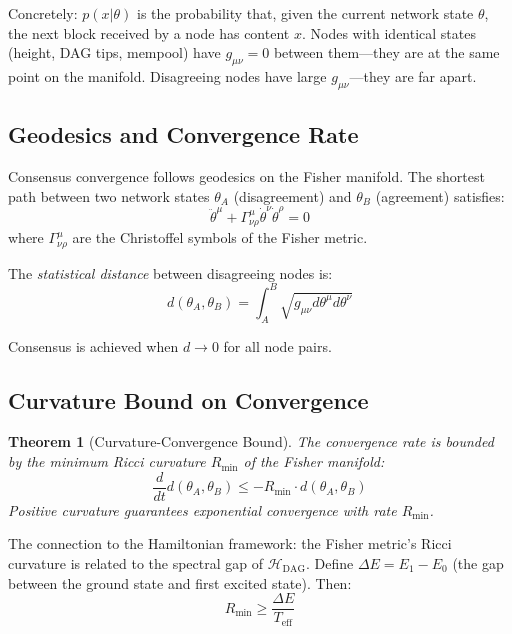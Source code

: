 \documentclass[12pt,a4paper,twocolumn]{article}
\newtheorem{theorem}{Theorem}
\newcommand{\Hdag}{\mathcal{H}_{\mathrm{DAG}}}
\newcommand{\Teff}{T_{\mathrm{eff}}}
\begin{document}
Concretely: $p(x|\theta)$ is the probability that, given the current network state $\theta$, the next block received by a node has content $x$. Nodes with identical states (height, DAG tips, mempool) have $g_{\mu\nu} = 0$ between them---they are at the same point on the manifold. Disagreeing nodes have large $g_{\mu\nu}$---they are far apart.

\subsection{Geodesics and Convergence Rate}

Consensus convergence follows geodesics on the Fisher manifold. The shortest path between two network states $\theta_A$ (disagreement) and $\theta_B$ (agreement) satisfies:
\begin{equation}
\ddot{\theta}^\mu + \Gamma^\mu_{\nu\rho} \dot{\theta}^\nu \dot{\theta}^\rho = 0
\end{equation}
where $\Gamma^\mu_{\nu\rho}$ are the Christoffel symbols of the Fisher metric.

The \emph{statistical distance} between disagreeing nodes is:
\begin{equation}
d(\theta_A, \theta_B) = \int_A^B \sqrt{g_{\mu\nu} d\theta^\mu d\theta^\nu}
\end{equation}

Consensus is achieved when $d \to 0$ for all node pairs.

\subsection{Curvature Bound on Convergence}

\begin{theorem}[Curvature-Convergence Bound]
The convergence rate is bounded by the minimum Ricci curvature $R_{\min}$ of the Fisher manifold:
\begin{equation}
\frac{d}{dt} d(\theta_A, \theta_B) \leq -R_{\min} \cdot d(\theta_A, \theta_B)
\end{equation}
Positive curvature guarantees exponential convergence with rate $R_{\min}$.
\end{theorem}

The connection to the Hamiltonian framework: the Fisher metric's Ricci curvature is related to the spectral gap of $\Hdag$. Define $\Delta E = E_1 - E_0$ (the gap between the ground state and first excited state). Then:
\begin{equation}
R_{\min} \geq \frac{\Delta E}{\Teff}
\end{equation}
\end{document}
